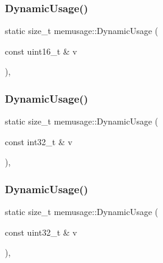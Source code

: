 \mbox{\label{namespacememusage_a401067c879de08c2db0cae8c91b70e9f}} 
\subsubsection{\texorpdfstring{Dynamic\+Usage()}{DynamicUsage()}\hspace{0.1cm}{\footnotesize\ttfamily [4/18]}}
{\footnotesize\ttfamily static size\+\_\+t memusage\+::\+Dynamic\+Usage (\begin{DoxyParamCaption}\item[{const uint16\+\_\+t \&}]{v }\end{DoxyParamCaption})\hspace{0.3cm}{\ttfamily [inline]}, {\ttfamily [static]}}

\mbox{\label{namespacememusage_af7aa88a5ff4779ae179c244ef00e1921}} 
\subsubsection{\texorpdfstring{Dynamic\+Usage()}{DynamicUsage()}\hspace{0.1cm}{\footnotesize\ttfamily [5/18]}}
{\footnotesize\ttfamily static size\+\_\+t memusage\+::\+Dynamic\+Usage (\begin{DoxyParamCaption}\item[{const int32\+\_\+t \&}]{v }\end{DoxyParamCaption})\hspace{0.3cm}{\ttfamily [inline]}, {\ttfamily [static]}}

\mbox{\label{namespacememusage_a0dc5b5e3dd169bc4e55cc7d74e08a46a}} 
\subsubsection{\texorpdfstring{Dynamic\+Usage()}{DynamicUsage()}\hspace{0.1cm}{\footnotesize\ttfamily [6/18]}}
{\footnotesize\ttfamily static size\+\_\+t memusage\+::\+Dynamic\+Usage (\begin{DoxyParamCaption}\item[{const uint32\+\_\+t \&}]{v }\end{DoxyParamCaption})\hspace{0.3cm}{\ttfamily [inline]}, {\ttfamily [static]}}


